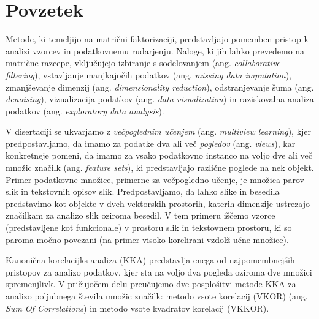 %
\chapter*{Povzetek}

Metode, ki temeljijo na matrični faktorizaciji, predstavljajo pomemben pristop k analizi vzorcev
in podatkovnemu rudarjenju. Naloge, ki jih lahko prevedemo na matrične razcepe, vključujejo izbiranje
s sodelovanjem (ang. \emph{collaborative filtering}), vstavljanje manjkajočih podatkov (ang. \emph{missing data imputation}),
zmanjševanje dimenzij (ang. \emph{dimensionality reduction}), odstranjevanje šuma (ang. \emph{denoising}), vizualizacija
podatkov (ang. \emph{data visualization}) in raziskovalna analiza podatkov (ang. \emph{exploratory data analysis}).

V disertaciji se ukvarjamo z \emph{večpoglednim učenjem} (ang. \emph{multiview learning}), kjer
predpostavljamo, da imamo za podatke dva ali več \emph{pogledov} (ang. \emph{views}), kar konkretneje
pomeni, da imamo za vsako podatkovno instanco na voljo dve ali več množic značilk (ang. \emph{feature sets}),
ki predstavljajo različne poglede na nek objekt. Primer podatkovne množice, primerne za večpogledno učenje,
je množica parov slik in tekstovnih opisov slik. Predpostavljamo, da lahko slike in besedila
predstavimo kot objekte v dveh vektorskih prostorih, katerih dimenzije ustrezajo značilkam za analizo
slik oziroma besedil. V tem primeru iščemo vzorce (predstavljene kot funkcionale) v prostoru slik
in tekstovnem prostoru, ki so paroma močno povezani (na primer visoko korelirani vzdolž učne množice).

Kanonična korelacijks analiza (KKA) predstavlja enega od najpomembnejših pristopov za analizo
podatkov, kjer sta na voljo dva pogleda oziroma dve množici spremenjlivk. V pričujočem delu
preučujemo dve posplošitvi metode KKA za analizo poljubnega števila množic značilk: metodo
vsote korelacij (VKOR) (ang. \emph{Sum Of Correlations}) in metodo vsote kvadratov korelacij (VKKOR).

